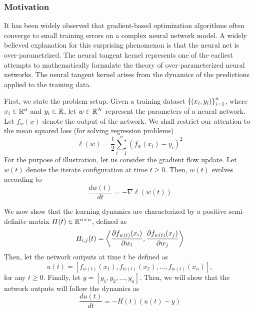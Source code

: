 \subsubsection{Motivation}

It has been widely observed that gradient-based optimization algorithms often converge to small training errors on a complex neural network model.
A widely believed explanation for this surprising phenomenon is that the neural net is over-parametrized.
The neural tangent kernel represents one of the earliest attempts to mathematically formulate the theory of over-parameterized neural networks.
The neural tangent kernel arises from the dynamics of the predictions applied to the training data.

First, we state the problem setup. Given a training dataset $\left\{(x_i, y_i)\right\}_{i = 1}^n$, where $x_i \in\mathbb{R}^d$ and $y_i \in\mathbb{R}$, let $w\in\mathbb{R}^N$ represent the parameters of a neural network.
Let $f_w(x)$ denote the output of the network.
We shall restrict our attention to the mean squared loss (for solving regression problems)
\[ \ell(w) = \frac 1 2 \sum_{i=1}^n (f_w(x_i) - y_i)^2 \]
For the purpose of illustration, let us consider the gradient flow update.
Let $w(t)$ denote the iterate configuration at time $t \ge 0$.
Then, $w(t)$ evolves according to
\[ \frac {d w(t)} {d t} = -\nabla \ell(w(t)) \]

We now show that the learning dynamics are characterized by a positive semi-definite matrix $H(t) \in \mathbb{R}^{n \times n}$, defined as
\begin{align} H_{i, j}(t) = \left\langle \frac {\partial f_{w(t)}(x_i)} {\partial w_i}, \frac {\partial f_{w(t)}(x_j)} {\partial w_j} \right\rangle \label{eq_ht}
\end{align}
Then, let the network outputs at time $t$ be defined as
\[ u(t) = [ f_{w(t)}(x_1), f_{w(t)}(x_2), \dots, f_{w(t)}(x_n) ], \]
for any $t \ge 0$.
Finally, let $y = [y_1, y_2, \dots, y_n]$.
Then, we will show that the network outputs will follow the dynamics as
\[ \frac {d u(t)} {dt} = - H(t) ( u(t) - y ) \]

